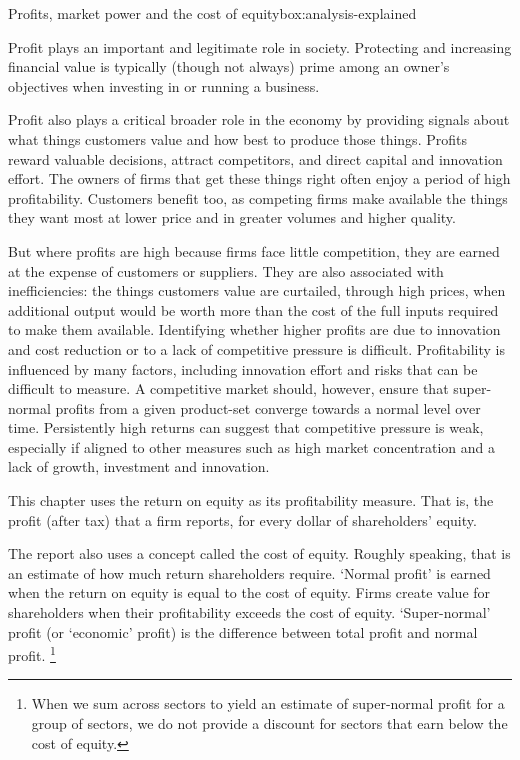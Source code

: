 \begin{bigbox}{Profits, market power and the cost of equity}{box:analysis-explained}

Profit plays an important and legitimate role in society. Protecting and increasing financial value is typically (though not always) prime among an owner's objectives when investing in or running a business.

Profit also plays a critical broader role in the economy by providing signals about what things customers value and how best to produce those things. Profits reward valuable decisions, attract competitors, and direct capital and innovation effort. The owners of firms that get these things right often enjoy a period of high profitability. Customers benefit too, as competing firms make available the things they want most at lower price and in greater volumes and higher quality.

But where profits are high because firms face little competition, they are earned at the expense of customers or suppliers. They are also associated with inefficiencies: the things customers value are curtailed, through high prices, when additional output would be worth more than the cost of the full inputs required to make them available. 
Identifying whether higher profits are due to innovation and cost reduction or to a lack of competitive pressure is difficult. Profitability is influenced by many factors, including innovation effort and risks that can be difficult to measure. A competitive market should, however, ensure that super-normal profits from a given product-set converge towards a normal level over time. Persistently high returns can suggest that competitive pressure is weak, especially if aligned to other measures such as high market concentration and a lack of growth, investment and innovation. 

This chapter uses the return on equity as its profitability measure. That is, the profit (after tax) that a firm reports, for every dollar of shareholders' equity.

The report also uses a concept called the cost of equity. Roughly speaking, that is an estimate of how much return shareholders require. `Normal profit' is earned when the return on equity is equal to the cost of equity. Firms create value for shareholders when their profitability exceeds the cost of equity. `Super-normal' profit (or `economic' profit) is the difference between total profit and normal profit.%
\footnote{When we sum across sectors to yield an estimate of super-normal profit for a group of sectors, we do not provide a discount for sectors that earn below the cost of equity.}


\end{bigbox}
